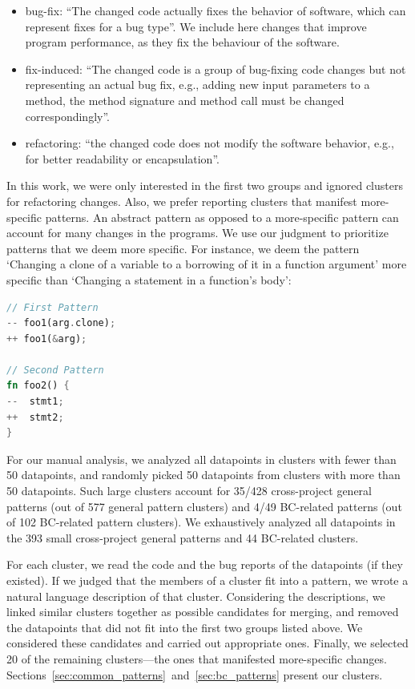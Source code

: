 \begin{itemize}
    \item bug-fix: ``The changed code actually fixes the behavior of software, which can represent fixes for a bug type''. We include here changes that improve program performance, as they fix the behaviour of the software.

    \item fix-induced: ``The changed code is a group of bug-fixing code changes but not representing an actual bug fix, e.g., adding new input parameters to a method, the method signature and method call must be changed correspondingly''.
    
    \item refactoring: ``the changed code does not modify the software behavior, e.g., for better readability or encapsulation''.
\end{itemize}

In this work, we were only interested in the first two groups and ignored clusters for refactoring changes. Also, we prefer reporting clusters that manifest more-specific patterns. An abstract pattern as opposed to a more-specific pattern can account for many changes in the programs. We use our judgment to prioritize patterns that we deem more specific. For instance, we deem the pattern `Changing a clone of a variable to a borrowing of it in a function argument' more specific than `Changing a statement in a function's body':

\begin{lstlisting}[language=Rust, style=colouredRust]
// First Pattern
-- foo1(arg.clone);
++ foo1(&arg);

// Second Pattern
fn foo2() {
--  stmt1;
++  stmt2;
}

\end{lstlisting}


For our manual analysis, we analyzed all datapoints in clusters with fewer than 50 datapoints, and randomly picked 50 datapoints from clusters with more than 50 datapoints. Such large clusters account for 35/428 cross-project general patterns (out of 577 general pattern clusters) and 4/49 BC-related patterns (out of 102 BC-related pattern clusters). We exhaustively analyzed all datapoints in the 393 small cross-project general patterns and 44 BC-related clusters.

For each cluster, we read the code and the bug reports of the datapoints (if they existed). If we judged that the members of a cluster fit into a pattern, we wrote a natural language description of that cluster. Considering the descriptions, we linked similar clusters together as possible candidates for merging, and removed the datapoints that did not fit into the first two groups listed above. We considered these candidates and carried out appropriate ones. Finally, we selected 20 of the remaining clusters---the ones that manifested more-specific changes. Sections~\ref{sec:common_patterns}~and~\ref{sec:bc_patterns} present our clusters.
